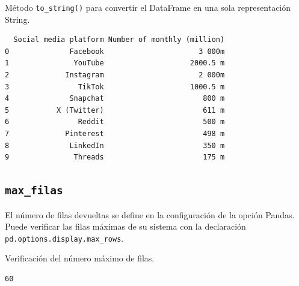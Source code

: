 \begin{code} Método \texttt{to\_string()} para convertir el DataFrame en una sola representación String.
\begin{Shaded}
\begin{Highlighting}[]

\OperatorTok{=}\NormalTok{)}

\end{Highlighting}
\end{Shaded}

\begin{verbatim}
  Social media platform Number of monthly (million)
0              Facebook                      3 000m
1               YouTube                    2000.5 m
2             Instagram                      2 000m
3                TikTok                    1000.5 m
4              Snapchat                       800 m
5           X (Twitter)                       611 m
6                Reddit                       500 m
7             Pinterest                       498 m
8              LinkedIn                       350 m
9               Threads                       175 m
\end{verbatim}
\end{code}

\subsection{\texorpdfstring{\texttt{max\_filas}}{max\_filas}}

El número de filas devueltas se define en la configuración de la opción
Pandas. Puede verificar las filas máximas de su sistema con la
declaración \texttt{pd.options.display.max\_rows}.\\

\begin{code} Verificación del número máximo de filas.
\begin{Shaded}
\begin{Highlighting}[]

\end{Highlighting}
\end{Shaded}

\begin{verbatim}
60
\end{verbatim}
\end{code}

